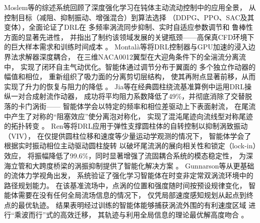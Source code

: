 Moslem等的综述系统回顾了深度强化学习在钝体主动流动控制中的应用全景，
从控制目标（减阻、抑制振动、增强混合）到算法选择
（DDPG、PPO、SAC及其变体），全面论证了DRL在
多频率涡流同步抑制、实时自适应参数调节和
鲁棒性方面的显著先进性，
并指出了制约该领域发展的关键瓶颈——高保真CFD环境下
的巨大样本需求和训练时间成本
\cite{moslemDeepReinforcementLearning2025}。
Montalà等将DRL控制器与GPU加速的浸入边界法求解器深度耦合，
在三维NACA0012翼型在大迎角条件下的全湍流分离流中，
实现了闭环自主气动优化。智能体通过调节分布于翼面的
多个独立作动器的幅值和相位，
重新组织了吸力面的分离剪切层结构，
使其再附点显著前移，从而实现了升力的恢复与阻力的降低
\cite{montalADRLFlowSeparation2025}。
Jia等在经典圆柱绕流基准算例中运用DRL操纵一对合成射流作动器，
成功将平均阻力系数降低了49\%，并彻底消除了交替脱落的卡门涡街——
智能体学会以特定的频率和相位差驱动上下表面射流，
在尾流中产生了对称的“阻塞效应”使分离泡对称化，
实现了混沌尾迹向流线型对称尾迹的拓扑转变
\cite{jiaActiveFlowControl2025}。
Ren等将DRL应用于弹性支撑圆柱体的自转控制以抑制涡致振动（VIV），
在仅提供圆柱位移和速度等少量运动学观测的情况下，
智能体学会了根据实时振动相位主动驱动圆柱旋转
以破坏尾流涡的展向相关性和锁定（lock-in）效应，
将振幅降低了99.6\%，同时显著增强了流固耦合系统的模态稳定性，
为深海立管和大跨度桥梁的涡振抑制提供了智能化解决方案
\cite{renDRLVIV2024}。
Gunnarson等从更基础的流体力学视角出发，
系统验证了强化学习智能体在时变非定常双涡流环境中的路径规划能力。
在该基准流场中，点涡的位置和强度随时间按预设规律变化，
智能体需要在没有任何全局流场信息的情况下，
仅凭局部速度感知规划从起点到终点的最优轨迹。
结果表明经过训练的智能体能够捕获涡流外围的有利速度区域
进行“乘波而行”式的高效迁移，
其轨迹与利用全局信息的理论最优解高度吻合
\cite{gunnarsonNavigationVortical2021}。

